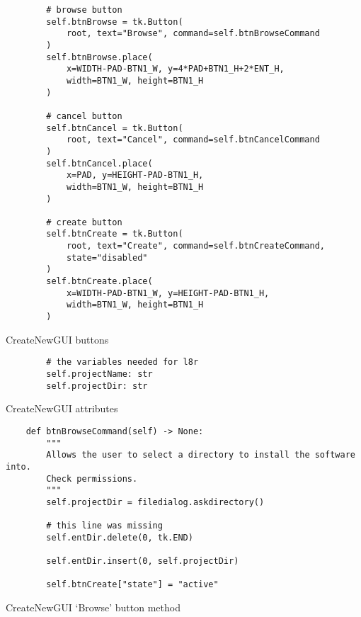 \newpage
\begin{listing}[!ht]
    \begin{verbatim}
        # browse button
        self.btnBrowse = tk.Button(
            root, text="Browse", command=self.btnBrowseCommand
        )
        self.btnBrowse.place(
            x=WIDTH-PAD-BTN1_W, y=4*PAD+BTN1_H+2*ENT_H, 
            width=BTN1_W, height=BTN1_H
        )
        
        # cancel button
        self.btnCancel = tk.Button(
            root, text="Cancel", command=self.btnCancelCommand
        )
        self.btnCancel.place(
            x=PAD, y=HEIGHT-PAD-BTN1_H, 
            width=BTN1_W, height=BTN1_H
        )
        
        # create button
        self.btnCreate = tk.Button(
            root, text="Create", command=self.btnCreateCommand, 
            state="disabled"
        )
        self.btnCreate.place(
            x=WIDTH-PAD-BTN1_W, y=HEIGHT-PAD-BTN1_H, 
            width=BTN1_W, height=BTN1_H
        )
    \end{verbatim}
    \caption{CreateNewGUI buttons}
    \label{sc:createnew-gui-buttons-init}
\end{listing}

\newpage
\begin{listing}[!ht]
    \begin{verbatim}
        # the variables needed for l8r 
        self.projectName: str
        self.projectDir: str
    \end{verbatim}
    \caption{CreateNewGUI attributes}
    \label{sc:createnew-gui-attributes}
\end{listing}

\newpage
\begin{listing}[!ht]
    \begin{verbatim}
    def btnBrowseCommand(self) -> None:
        """ 
        Allows the user to select a directory to install the software into. 
        Check permissions. 
        """
        self.projectDir = filedialog.askdirectory()
        
        # this line was missing
        self.entDir.delete(0, tk.END)
        
        self.entDir.insert(0, self.projectDir)
        
        self.btnCreate["state"] = "active"
    \end{verbatim}
    \caption{CreateNewGUI `Browse' button method}
    \label{sc:createnew-gui-browse-method}
\end{listing}

